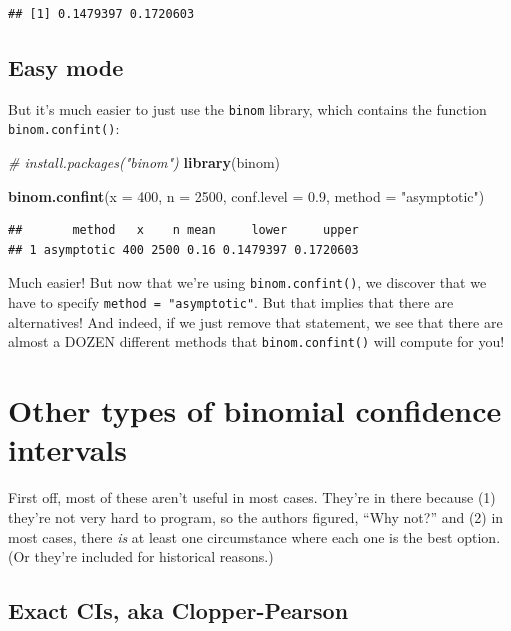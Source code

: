 \documentclass[
]{book}
\newenvironment{Shaded}{\begin{snugshade}}{\end{snugshade}}
\newcommand{\CommentTok}[1]{\textcolor[rgb]{0.56,0.35,0.01}{\textit{#1}}}
\newcommand{\DataTypeTok}[1]{\textcolor[rgb]{0.13,0.29,0.53}{#1}}
\newcommand{\DecValTok}[1]{\textcolor[rgb]{0.00,0.00,0.81}{#1}}
\newcommand{\FloatTok}[1]{\textcolor[rgb]{0.00,0.00,0.81}{#1}}
\newcommand{\KeywordTok}[1]{\textcolor[rgb]{0.13,0.29,0.53}{\textbf{#1}}}
\newcommand{\NormalTok}[1]{#1}
\newcommand{\StringTok}[1]{\textcolor[rgb]{0.31,0.60,0.02}{#1}}
\theoremstyle{definition}
\theoremstyle{definition}
\theoremstyle{definition}
\theoremstyle{remark}
\begin{document}
\begin{verbatim}
## [1] 0.1479397 0.1720603
\end{verbatim}

\hypertarget{easy-mode}{%
\subsection{Easy mode}\label{easy-mode}}

But it's much easier to just use the \texttt{binom} library, which contains the function \texttt{binom.confint()}:

\begin{Shaded}
\begin{Highlighting}[]
\CommentTok{# install.packages("binom")}
\KeywordTok{library}\NormalTok{(binom)}

\KeywordTok{binom.confint}\NormalTok{(}\DataTypeTok{x =} \DecValTok{400}\NormalTok{, }\DataTypeTok{n =} \DecValTok{2500}\NormalTok{, }\DataTypeTok{conf.level =} \FloatTok{0.9}\NormalTok{, }\DataTypeTok{method =} \StringTok{"asymptotic"}\NormalTok{)}
\end{Highlighting}
\end{Shaded}

\begin{verbatim}
##       method   x    n mean     lower     upper
## 1 asymptotic 400 2500 0.16 0.1479397 0.1720603
\end{verbatim}

Much easier! But now that we're using \texttt{binom.confint()}, we discover that we have to specify \texttt{method\ =\ "asymptotic"}. But that implies that there are alternatives! And indeed, if we just remove that statement, we see that there are almost a DOZEN different methods that \texttt{binom.confint()} will compute for you!

\hypertarget{other-types-of-binomial-confidence-intervals}{%
\section{Other types of binomial confidence intervals}\label{other-types-of-binomial-confidence-intervals}}

First off, most of these aren't useful in most cases. They're in there because (1) they're not very hard to program, so the authors figured, ``Why not?'' and (2) in most cases, there \emph{is} at least one circumstance where each one is the best option. (Or they're included for historical reasons.)

\hypertarget{exact-cis-aka-clopper-pearson}{%
\subsection{Exact CIs, aka Clopper-Pearson}\label{exact-cis-aka-clopper-pearson}}
\end{document}
